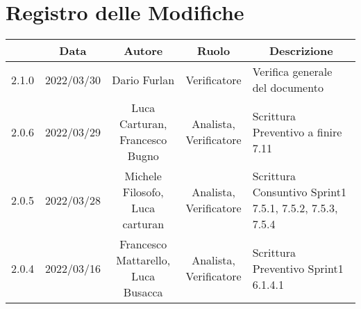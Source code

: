 \thispagestyle{empty}
\section*{Registro delle Modifiche}

\begin{center}
	\renewcommand{\arraystretch}{1.8}
	\begin{longtable}[c]{c | c | c | c | p{5cm}}
		\rowcolor[HTML]{125E28}
		\multicolumn{1}{c}{\color[HTML]{FFFFFF} \textbf{Versione}} &
		\multicolumn{1}{c}{\color[HTML]{FFFFFF} \textbf{Data}}     &
		\multicolumn{1}{c}{\color[HTML]{FFFFFF} \textbf{Autore}}   &
		\multicolumn{1}{c}{\color[HTML]{FFFFFF} \textbf{Ruolo}}    &
		\multicolumn{1}{c}{\color[HTML]{FFFFFF} \textbf{Descrizione}}                                                                                                                                                                                                                 \\
		\endhead
		2.1.0                                                      & 2022/03/30 & Dario Furlan                           & Verificatore   & Verifica generale del documento                                                                                                           \\
		2.0.6                                                      & 2022/03/29 & \Shortunderstack{Luca Carturan,                                                                                                                                                                     \\Francesco Bugno} & \Shortunderstack{Analista,\\Verificatore} & Scrittura Preventivo a finire 7.11\\
		2.0.5                                                      & 2022/03/28 & \Shortunderstack{Michele Filosofo,                                                                                                                                                                  \\Luca carturan} & \Shortunderstack{Analista,\\Verificatore} & Scrittura Consuntivo Sprint1 7.5.1, 7.5.2, 7.5.3, 7.5.4\\
		2.0.4                                                      & 2022/03/16 & \Shortunderstack{Francesco Mattarello,                                                                                                                                                              \\Luca Busacca} & \Shortunderstack{Analista,\\Verificatore} & Scrittura Preventivo Sprint1 6.1.4.1\\

\end{longtable}
\end{center}
